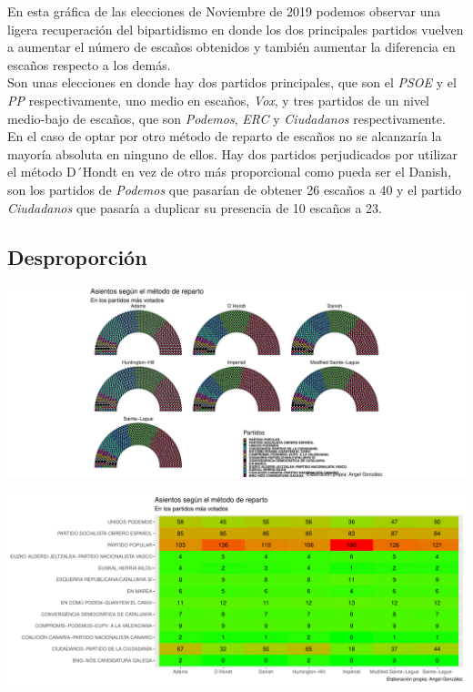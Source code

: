 \documentclass[12pt,a4paper,]{book}
\numberwithin{dummy}{section}
\theoremstyle{ocrenumbox}
\theoremstyle{blacknumex}
\theoremstyle{blacknumbox}
\theoremstyle{ocrenum}
\theoremstyle{ocrenum}
\begin{document}
En esta gráfica de las elecciones de Noviembre de 2019 podemos observar
una ligera recuperación del bipartidismo en donde los dos principales
partidos vuelven a aumentar el número de escaños obtenidos y también
aumentar la diferencia en escaños respecto a los demás.\\
Son unas elecciones en donde hay dos partidos principales, que son el
\emph{PSOE} y el \emph{PP} respectivamente, uno medio en escaños,
\emph{Vox}, y tres partidos de un nivel medio-bajo de escaños, que son
\emph{Podemos}, \emph{ERC} y \emph{Ciudadanos} respectivamente.\\
En el caso de optar por otro método de reparto de escaños no se
alcanzaría la mayoría absoluta en ninguno de ellos. Hay dos partidos
perjudicados por utilizar el método D´Hondt en vez de otro más
proporcional como pueda ser el Danish, son los partidos de
\emph{Podemos} que pasarían de obtener 26 escaños a 40 y el partido
\emph{Ciudadanos} que pasaría a duplicar su presencia de 10 escaños a
23.

\hypertarget{desproporciuxf3n-14}{%
\subsection{Desproporción}\label{desproporciuxf3n-14}}

\begin{center}\includegraphics[width=1\linewidth]{figurasR/unnamed-chunk-119-1} \end{center}

\begin{center}\includegraphics[width=1\linewidth]{figurasR/unnamed-chunk-119-2} \end{center}
\end{document}
